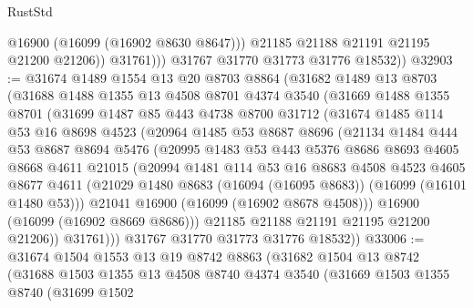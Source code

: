 \begin{lexlean}{RustStd}
\begin{coremodule}
                    @16900
                    (@16099 (@16902 @8630 @8647)))
                  @21185
                  @21188
                  @21191
                  @21195
                  @21200
                  @21206))
              @31761)))
        @31767
        @31770
        @31773
        @31776
        @18532))
@32903 := @31674
    @1489
    @1554
    @13
    @20
    @8703
    @8864
    (@31682
      @1489
      @13
      @8703
      (@31688
        @1488
        @1355
        @13
        @4508
        @8701
        @4374
        @3540
        (@31669
          @1488
          @1355
          @8701
          (@31699
            @1487
            @85
            @443
            @4738
            @8700
            @31712
            (@31674
              @1485
              @114
              @53
              @16
              @8698
              @4523
              (@20964
                @1485
                @53
                @8687
                @8696
                (@21134
                  @1484
                  @444
                  @53
                  @8687
                  @8694
                  @5476
                  (@20995
                    @1483
                    @53
                    @443
                    @5376
                    @8686
                    @8693
                    @4605
                    @8668
                    @4611
                    @21015
                    (@20994
                      @1481
                      @114
                      @53
                      @16
                      @8683
                      @4508
                      @4523
                      @4605
                      @8677
                      @4611
                      (@21029 @1480 @8683 (@16094 (@16095 @8683)) (@16099 (@16101 @1480 @53)))
                      @21041
                      @16900
                      (@16099 (@16902 @8678 @4508)))
                    @16900
                    (@16099 (@16902 @8669 @8686)))
                  @21185
                  @21188
                  @21191
                  @21195
                  @21200
                  @21206))
              @31761)))
        @31767
        @31770
        @31773
        @31776
        @18532))
@33006 := @31674
    @1504
    @1553
    @13
    @19
    @8742
    @8863
    (@31682
      @1504
      @13
      @8742
      (@31688
        @1503
        @1355
        @13
        @4508
        @8740
        @4374
        @3540
        (@31669
          @1503
          @1355
          @8740
          (@31699
            @1502

\end{coremodule}
\end{lexlean}
